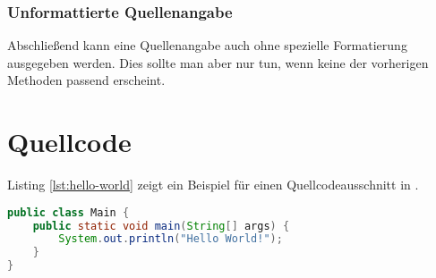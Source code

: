\subsubsection{Unformattierte Quellenangabe}

Abschließend kann eine Quellenangabe auch ohne spezielle Formatierung ausgegeben werden. Dies sollte man aber nur tun, wenn keine der vorherigen Methoden passend erscheint. \cite[100-101]{angenendt}


\section{Quellcode}

Listing \vref{lst:hello-world} zeigt ein Beispiel für einen Quellcodeausschnitt in \latex.

\begin{lstlisting}[language=Java, caption={Hello World in Java}, label=lst:hello-world]
public class Main {
	public static void main(String[] args) {
		System.out.println("Hello World!");
	}
}
\end{lstlisting}
